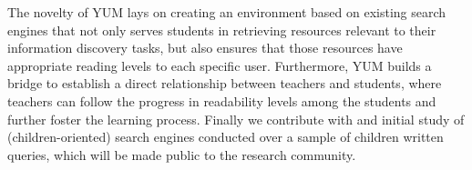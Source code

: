 \documentclass{sig-alternate-05-2015}
\begin{document}
The novelty of YUM lays on creating an environment based on existing search engines that not only serves students in retrieving resources relevant to their information discovery tasks, but also ensures that those resources have appropriate reading levels to each specific user. Furthermore, YUM builds a bridge to establish a direct relationship between teachers and students, where teachers can follow the progress in readability levels among the students and further foster the learning process. Finally we contribute with and initial study of (children-oriented) search engines conducted over a sample of children written queries, which will be made public to the research community.
\end{document}
